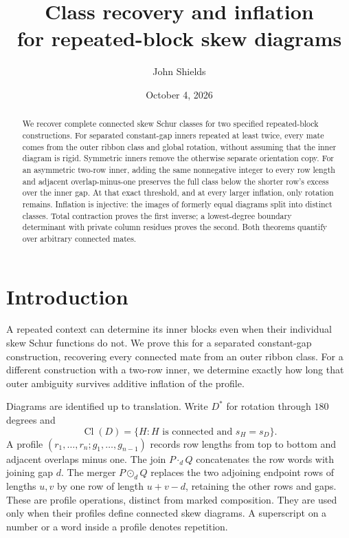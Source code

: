 \documentclass[11pt,a4paper]{amsart}
\title[Repeated-block classes and inflation]
{Class recovery and inflation\\
for repeated-block skew diagrams}
\author{John Shields}
\date{October 4, 2026}
\numberwithin{equation}{section}
\theoremstyle{plain}
\theoremstyle{definition}
\begin{document}
\begin{abstract}
We recover complete connected skew Schur classes for two specified repeated-block constructions.  For separated constant-gap inners repeated at least twice, every mate comes from the outer ribbon class and global rotation, without assuming that the inner diagram is rigid.  Symmetric inners remove the otherwise separate orientation copy.  For an asymmetric two-row inner, adding the same nonnegative integer to every row length and adjacent overlap-minus-one preserves the full class below the shorter row's excess over the inner gap.  At that exact threshold, and at every larger inflation, only rotation remains.  Inflation is injective: the images of formerly equal diagrams split into distinct classes.  Total contraction proves the first inverse; a lowest-degree boundary determinant with private column residues proves the second.  Both theorems quantify over arbitrary connected mates.
\end{abstract}

\maketitle

\section{Introduction}\label{sec:introduction}

A repeated context can determine its inner blocks even when their individual
skew Schur functions do not.  We prove this for a separated constant-gap
construction, recovering every connected mate from an outer ribbon class.
For a different construction with a two-row inner, we determine exactly how
long that outer ambiguity survives additive inflation of the profile.

Diagrams are identified up to translation.  Write \(D^*\) for rotation
through \(180\) degrees and
\[
 \operatorname{Cl}(D)=\{H:H\text{ is connected and }s_H=s_D\}.
\]
A profile \((r_1,\ldots,r_n;g_1,\ldots,g_{n-1})\) records row lengths
from top to bottom and adjacent overlaps minus one.  The join
\(P\cdot_d Q\) concatenates the row words with joining gap \(d\).
The merger \(P\odot_d Q\) replaces the two adjoining endpoint rows
of lengths \(u,v\) by one row of length \(u+v-d\), retaining the
other rows and gaps.  These are profile operations, distinct from marked
composition.  They are used only when their profiles define connected
skew diagrams.  A superscript on a number or a word inside a profile
denotes repetition.
\end{document}
